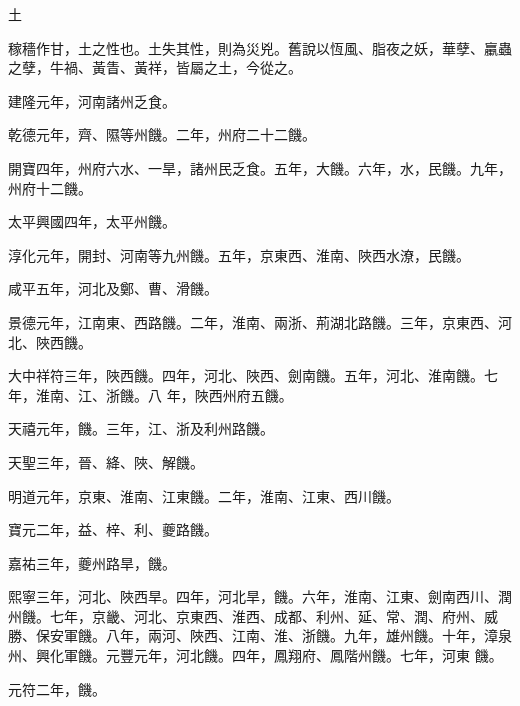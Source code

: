 
\begin{pinyinscope}

 土



 稼穡作甘，土之性也。土失其性，則為災兇。舊說以恆風、脂夜之妖，華孽、臝蟲之孽，牛禍、黃眚、黃祥，皆屬之土，今從之。



 建隆元年，河南諸州乏食。



 乾德元年，齊、隰等州饑。二年，州府二十二饑。



 開寶四年，州府六水、一旱，諸州民乏食。五年，大饑。六年，水，民饑。九年，州府十二饑。



 太平興國四年，太平州饑。



 淳化元年，開封、河南等九州饑。五年，京東西、淮南、陜西水潦，民饑。



 咸平五年，河北及鄭、曹、滑饑。



 景德元年，江南東、西路饑。二年，淮南、兩浙、荊湖北路饑。三年，京東西、河北、陜西饑。



 大中祥符三年，陜西饑。四年，河北、陜西、劍南饑。五年，河北、淮南饑。七年，淮南、江、浙饑。八
 年，陜西州府五饑。



 天禧元年，饑。三年，江、浙及利州路饑。



 天聖三年，晉、絳、陜、解饑。



 明道元年，京東、淮南、江東饑。二年，淮南、江東、西川饑。



 寶元二年，益、梓、利、夔路饑。



 嘉祐三年，夔州路旱，饑。



 熙寧三年，河北、陜西旱。四年，河北旱，饑。六年，淮南、江東、劍南西川、潤州饑。七年，京畿、河北、京東西、淮西、成都、利州、延、常、潤、府州、威勝、保安軍饑。八年，兩河、陜西、江南、淮、浙饑。九年，雄州饑。十年，漳泉州、興化軍饑。元豐元年，河北饑。四年，鳳翔府、鳳階州饑。七年，河東
 饑。



 元符二年，饑。




\end{pinyinscope}
